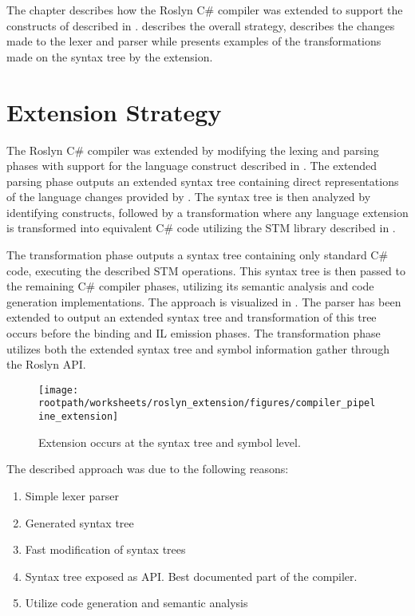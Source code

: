 \makeatletter {}\makeatother
{}
The chapter describes how the Roslyn C\# compiler was extended to support the constructs of \stmname described in .  describes the overall strategy,  describes the changes made to the lexer and parser while  presents examples of the transformations made on the syntax tree by the extension.
\label{chap:roslyn_extension}
\section{Extension Strategy}
\label{sec:roslyn_extension_strategy}
The Roslyn C\# compiler was extended by modifying the lexing and parsing phases with support for the language construct described in . The extended parsing phase outputs an extended syntax tree containing direct representations of the language changes provided by \stmname. The syntax tree is then analyzed by identifying \stmnamesp constructs, followed by a transformation where any language extension is transformed into equivalent C\# code utilizing the \ac{STM} library described in . 

The transformation phase outputs a syntax tree containing only standard C\# code, executing the described \ac{STM} operations. This syntax tree is then passed to the remaining C\# compiler phases, utilizing its semantic analysis and code generation implementations. The approach is visualized in . The parser has been extended to output an extended syntax tree and transformation of this tree occurs before the binding and IL emission phases. The transformation phase utilizes both the extended syntax tree and symbol information gather through the Roslyn \ac{API}.
\begin{figure}[htbp]
\centering
 \texttt{[image: \\rootpath/worksheets/roslyn\_extension/figures/compiler\_pipeline\_extension]} 
 \caption{Extension occurs at the syntax tree and symbol level.}
\label{fig:compiler_pipeline_extension}
\end{figure}

The described approach was due to the following reasons:
\begin{enumerate}
\item Simple lexer parser
\item Generated syntax tree
\item Fast modification of syntax trees
\item Syntax tree exposed as API. Best documented part of the compiler.
\item Utilize code generation and semantic analysis
\end{enumerate}

